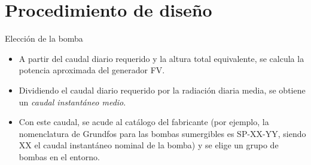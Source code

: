 \documentclass[xcolor={usenames,svgnames,dvipsnames}]{beamer}
\begin{document}
\section{Procedimiento de diseño}
\label{sec:org1956347}

\begin{frame}[label={sec:org4ab0657}]{Elección de la bomba}
\begin{itemize}
\item A partir del caudal diario requerido y la altura total equivalente, se calcula la potencia aproximada del generador FV.

\item Dividiendo el caudal diario requerido por la radiación diaria media, se obtiene un \emph{caudal instantáneo medio}.

\item Con este caudal, se acude al catálogo del fabricante (por ejemplo, la nomenclatura de Grundfos para las bombas sumergibles es SP-XX-YY, siendo XX el caudal instantáneo nominal de la bomba) y se elige un grupo de bombas en el entorno.
\end{itemize}
\end{frame}
\end{document}
